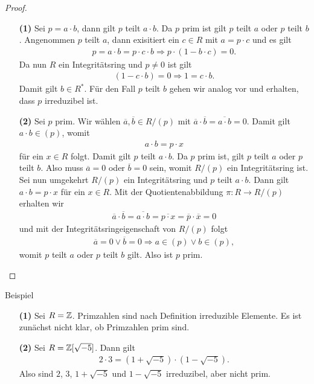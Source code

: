 \begin{proof}\
	\begin{enumerate}
		\item[\textbf{(1)}]
		Sei $p = a \cdot b$, dann gilt $p$ teilt $a \cdot b$.
		Da $p$ prim ist gilt $p$ teilt $a$ oder $p$ teilt $b$.
		Angenommen $p$ teilt $a$, dann exisitiert ein $c \in R$ mit $a = p \cdot c$
		und es gilt 
		\begin{align*}
		p = a \cdot b = p \cdot c \cdot b
		\Rightarrow
		p \cdot (1 - b\cdot c) = 0.
		\end{align*}
		Da nun $R$ ein Integritätsring und $p \neq 0$ ist gilt
		\begin{align*}
		(1 -c \cdot b ) = 0 
		\Rightarrow
		1 = c \cdot b. 
		\end{align*}
		Damit gilt $b \in R^\ast$.
		Für den Fall $p$ teilt $b$ gehen wir analog vor und erhalten, dass $p$ irreduzibel ist.
		
		\item[\textbf{(2)}]
		Sei $p$ prim. 
		Wir wählen $\overline{a}, \overline{b} \in  R / (p)$ mit
		$\overline{a} \cdot \overline{b} = \overline{a \cdot b} = 0$.
		Damit gilt $a \cdot b \in (p)$, womit 
		\begin{align*}
		a \cdot b = p \cdot x 
		\end{align*}
		für ein $x \in R$ folgt. Damit gilt $p$ teilt $a \cdot b$.
		Da $p$ prim ist, gilt $p$ teilt $a$ oder $p$ teilt $b$.
		Also muss $\overline{a} = 0$ oder $\overline{b} = 0$ sein,
		womit $R / (p)$ ein Integritätsring ist.
		Sei nun umgekehrt $R/ (p)$ ein Integritätsring und $p$ teilt $a \cdot b$.
		Dann gilt $a \cdot b = p \cdot x$ für ein $x \in R$.
		Mit der Quotientenabbildung $\pi : R \to R / (p)$ erhalten wir 
		\begin{align*}
		\overline{a} \cdot \overline{b} 
		= \overline{a \cdot b}
		= \overline{p \cdot x}
		= \overline{p} \cdot \overline{x}
		= 0
		\end{align*}
		und mit der Integritätsringeigenschaft von $R/ (p)$
		folgt
		\begin{align*}
		\overline{a} = 0 \vee  \overline{b} = 0
		\Rightarrow
		a \in (p) \vee b \in (p),
		\end{align*}
		womit $p $ teilt $a$ oder $p$ teilt $b$ gilt.
		Also ist $p$ prim.
	\end{enumerate}		
\end{proof}

\begin{genericdf}{Beispiel}\label{skript:9.3} \
	\begin{enumerate}
		\item[\textbf{(1)}]
		Sei $R = \mathbb{Z}$. Primzahlen sind nach Definition irreduzible Elemente.
		Es ist zunächst nicht klar, ob Primzahlen prim sind.
		
		\item[\textbf{(2)}]
		Sei $R = \mathbb{Z}[\sqrt{-5}]$.
		Dann gilt 
		\begin{align*}
		2 \cdot 3 = (1 + \sqrt{-5}) \cdot (1 - \sqrt{-5}).
		\end{align*}
		Also sind $2$, $3$, $1 + \sqrt{-5}$ und $1 - \sqrt{-5}$ irreduzibel, aber nicht prim.
	\end{enumerate}
\end{genericdf}

